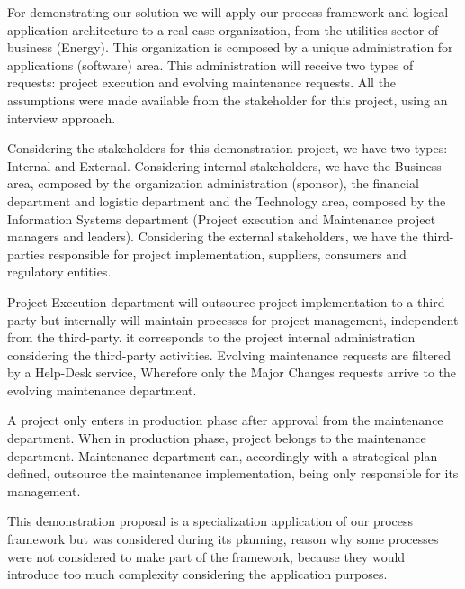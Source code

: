 For demonstrating our solution we will apply our process framework and logical application architecture to a real-case organization, from the utilities sector of business (Energy). This organization is composed by a unique administration for applications (software) area. This administration will receive two types of requests: project execution and evolving maintenance requests. All the assumptions were made available from the stakeholder for this project, using an interview approach.\par
Considering the stakeholders for this demonstration project, we have two types: Internal and External. Considering internal stakeholders, we have the Business area, composed by the organization administration (sponsor), the financial department and logistic department and the Technology area, composed by the Information Systems department (Project execution and Maintenance project managers and leaders). Considering the external stakeholders, we have the third-parties responsible for project implementation, suppliers, consumers and regulatory entities.\par
Project Execution department will outsource project implementation to a third-party but internally will maintain processes for project management, independent from the third-party. it corresponds to the project internal administration considering the third-party activities. Evolving maintenance requests are filtered by a Help-Desk service, Wherefore only the Major Changes requests arrive to the evolving maintenance department.\par
A project only enters in production phase after approval from the maintenance department. When in production phase, project belongs to the maintenance department. Maintenance department can, accordingly with a strategical plan defined, outsource the maintenance implementation, being only responsible for its management.\par
This demonstration proposal is a specialization application of our process framework but was considered during its planning, reason why some processes were not considered to make part of the framework, because they would introduce too much complexity considering the application purposes.\par



